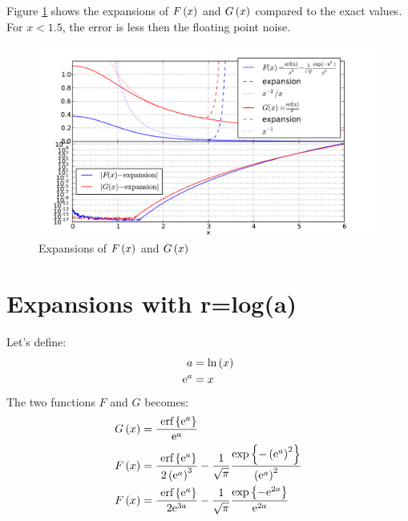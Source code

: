 \documentclass[12pt,letterpaper]{article}
\begin{document}
Figure \ref{fig:expansions_F_G} shows the expansions of $F\left( x \right)$ and $G\left( x \right)$
compared to the exact values. For $x < 1.5$, the error is less then the floating
point noise.

\begin{figure}
    \includegraphics[width=0.98\columnwidth]{expansions_F_G}
    \caption{Expansions of $F\left( x \right)$ and $G\left( x \right)$}
    \label{fig:expansions_F_G}
\end{figure}


\section{Expansions with r=log(a)}
Let's define:
\begin{align}
a &= \textrm{ln} \left( x \right) \\
\textrm{e}^{a} & = x
\end{align}
The two functions $F$ and $G$ becomes:
\begin{align}
G\left( x \right) & = \frac{~\textrm{erf} \left\{\textrm{e}^{a}\right\}}{\textrm{e}^{a}} \\
F\left( x \right) & = \frac{ ~\textrm{erf} \left\{\textrm{e}^{a}\right\} }{2 \left( \textrm{e}^{a} \right)^3} - \frac{1}{\sqrt{\pi}} \frac{ \exp{ \left\{ -\left( \textrm{e}^{a} \right)^2 \right\}} }{\left( \textrm{e}^{a} \right)^2} \\
F\left( x \right) & = \frac{ ~\textrm{erf} \left\{\textrm{e}^{a}\right\} }{2 \textrm{e}^{3 a}} - \frac{1}{\sqrt{\pi}} \frac{ \exp{ \left\{ -\textrm{e}^{2 a} \right\}} }{\textrm{e}^{2 a}}
\end{align}
\end{document}
